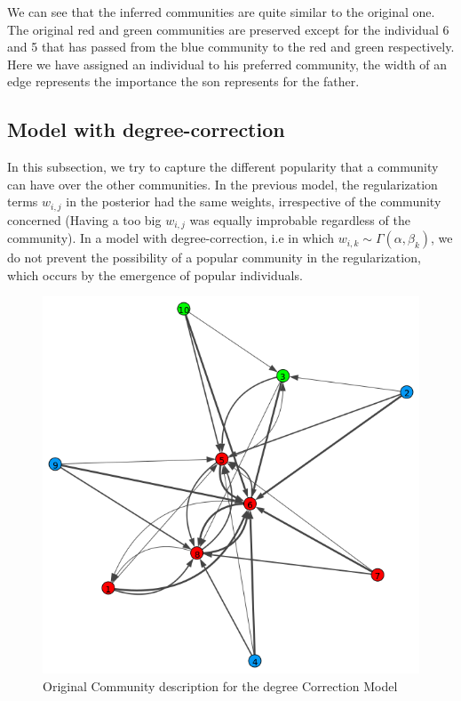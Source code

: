 \documentclass[12pt]{ociamthesis}  %
\begin{document}
	We can see that the inferred communities are quite similar to the original one. The original red and green communities are preserved except for the individual 6 and 5 that has passed from the blue community to the red and green respectively. Here we have assigned an individual to his preferred community, the width of an edge represents the importance the son represents for the father.
	\subsection{Model with degree-correction}
	
	In this subsection, we try to capture the different popularity that a community can have over the other communities. In the previous model, the regularization terms $w_{i,j}$ in the posterior had the same weights, irrespective of the community concerned (Having a too big $w_{i,j}$ was equally improbable regardless of the community). In a model with degree-correction, i.e in which $w_{i,k} \sim  \Gamma(\alpha, \beta_{k})$, we do not prevent the possibility of a popular community in the regularization, which occurs by the emergence of popular individuals.
	\begin{figure}
		\centering
		\includegraphics[width=\textwidth,height=\textheight,keepaspectratio]{OriginalPlotDegreeCorrection}
		\caption{Original Community description for the degree Correction Model}
		\label{label-image5}
	\end{figure}
	
\end{document}
